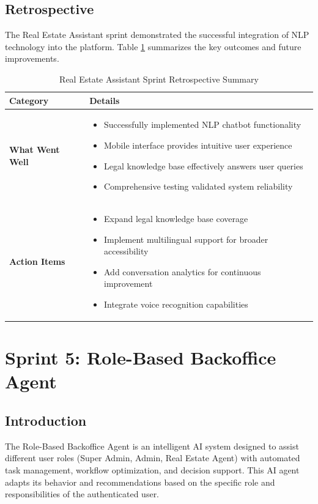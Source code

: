 \subsection{Retrospective}

The Real Estate Assistant sprint demonstrated the successful integration of NLP technology into the platform. Table \ref{tab:assistant-retrospective} summarizes the key outcomes and future improvements.

\begin{table}[htbp]
    \centering
    \begin{tabular}{|p{3cm}|p{10cm}|}
        \hline
        \textbf{Category} & \textbf{Details} \\
        \hline
        \textbf{What Went Well} & 
        \begin{itemize}
            \item Successfully implemented NLP chatbot functionality
            \item Mobile interface provides intuitive user experience
            \item Legal knowledge base effectively answers user queries
            \item Comprehensive testing validated system reliability
        \end{itemize} \\
        \hline
        \textbf{Action Items} & 
        \begin{itemize}
            \item Expand legal knowledge base coverage
            \item Implement multilingual support for broader accessibility
            \item Add conversation analytics for continuous improvement
            \item Integrate voice recognition capabilities
        \end{itemize} \\
        \hline
    \end{tabular}
    \caption{Real Estate Assistant Sprint Retrospective Summary}
    \label{tab:assistant-retrospective}
\end{table}

\newpage

\section{Sprint 5: Role-Based Backoffice Agent}
\subsection*{Introduction}
The Role-Based Backoffice Agent is an intelligent AI system designed to assist different user roles (Super Admin, Admin, Real Estate Agent) with automated task management, workflow optimization, and decision support. This AI agent adapts its behavior and recommendations based on the specific role and responsibilities of the authenticated user.

